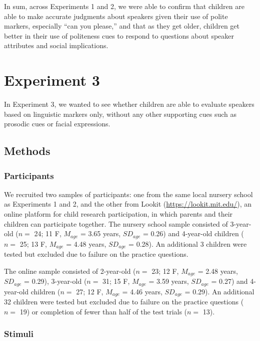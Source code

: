 \documentclass[10pt, letterpaper]{article}
\begin{document}
In sum, across Experiments 1 and 2, we were able to confirm that
children are able to make accurate judgments about speakers given their
use of polite markers, especially ``can you please,'' and that as they
get older, children get better in their use of politeness cues to
respond to questions about speaker attributes and social implications.

\section{Experiment 3}\label{experiment-3}

In Experiment 3, we wanted to see whether children are able to evaluate
speakers based on linguistic markers only, without any other supporting
cues such as prosodic cues or facial expressions.

\subsection{Methods}\label{methods-2}

\subsubsection{Participants}\label{participants-2}

We recruited two samples of participants: one from the same local
nursery school as Experiments 1 and 2, and the other from Lookit
(\url{https://lookit.mit.edu/}), an online platform for child research
participation, in which parents and their children can participate
together. The nursery school sample consisted of 3-year-old (\(n=\) 24;
11 F, \(M_{age}\) = 3.65 years, \(SD_{age}\) = 0.26) and 4-year-old
children (\(n=\) 25; 13 F, \(M_{age}\) = 4.48 years, \(SD_{age}\) =
0.28). An additional 3 children were tested but excluded due to failure
on the practice questions.

The online sample consisted of 2-year-old (\(n=\) 23; 12 F, \(M_{age}\)
= 2.48 years, \(SD_{age}\) = 0.29), 3-year-old (\(n=\) 31; 15 F,
\(M_{age}\) = 3.59 years, \(SD_{age}\) = 0.27) and 4-year-old children
(\(n=\) 27; 12 F, \(M_{age}\) = 4.46 years, \(SD_{age}\) = 0.29). An
additional 32 children were tested but excluded due to failure on the
practice questions (\(n=\) 19) or completion of fewer than half of the
test trials (\(n=\) 13).

\subsubsection{Stimuli}\label{stimuli}
\end{document}

